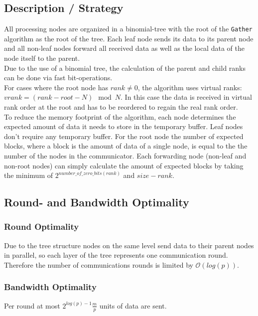 \subsection{Description / Strategy}

All processing nodes are organized in a binomial-tree with the root of the \texttt{Gather} algorithm as the root of the tree. Each leaf node sends its data to its parent node and all non-leaf nodes forward all received data as well as the local data of the node itself to the parent. \\
Due to the use of a binomial tree, the calculation of the parent and child ranks can be done via fast bit-operations.\\

\noindent For cases where the root node has $rank \neq 0$, the algorithm uses virtual ranks:
$vrank = (rank - root - N ) \mod N$. In this case the data is received in virtual rank order at the root and has to be reordered to regain the real rank order.\\

\noindent To reduce the memory footprint of the algorithm, each node determines the expected amount of data it needs to store in the temporary buffer. Leaf nodes don't require any temporary buffer. For the root node the number of expected blocks, where a block is the amount of data of a single node, is equal to the the number of the nodes in the communicator. Each forwarding node (non-leaf and non-root nodes) can simply calculate the amount of expected blocks by taking the minimum of 
$2^{number\_of\_zero\_bits(rank)}$ and $size - rank$.

\subsection{Round- and Bandwidth Optimality}

\subsubsection{Round Optimality}
Due to the tree structure nodes on the same level send data to their parent nodes in parallel, so each layer of the tree represents one communication round. Therefore the number of communications rounds is limited by $\mathcal{O}(log(p))$.

\subsubsection{Bandwidth Optimality}
Per round at most $2^{log(p)-1} \frac{m}{p}$ units of data are sent. %

